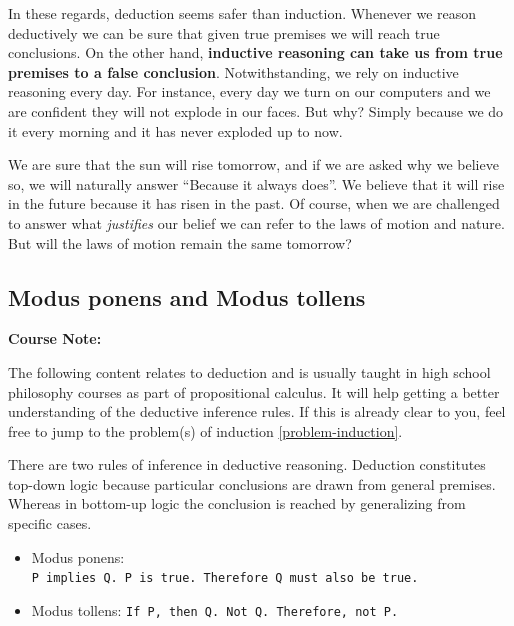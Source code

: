\documentclass[
]{book}
\providecommand{\tightlist}{%
  \setlength{\itemsep}{0pt}\setlength{\parskip}{0pt}}
\begin{document}
In these regards, deduction seems safer than induction. Whenever we reason deductively we can be sure that given true premises we will reach true conclusions. On the other hand, \textbf{inductive reasoning can take us from true premises to a false conclusion}. Notwithstanding, we rely on inductive reasoning every day. For instance, every day we turn on our computers and we are confident they will not explode in our faces. \citep{okasha-pos} But why? Simply because we do it every morning and it has never exploded up to now.

We are sure that the sun will rise tomorrow, and if we are asked why we believe so, we will naturally answer ``Because it always does''. We believe that it will rise in the future because it has risen in the past. Of course, when we are challenged to answer what \emph{justifies} our belief we can refer to the laws of motion and nature. But will the laws of motion remain the same tomorrow? \citep{russell2001problems}

\hypertarget{modus}{%
\subsection{Modus ponens and Modus tollens}\label{modus}}

\begin{notebox}

\begin{center}
\textbf{Course Note:}

\end{center}

The following content relates to deduction and is usually taught in high school philosophy courses as part of propositional calculus. It will help getting a better understanding of the deductive inference rules. If this is already clear to you, feel free to jump to the problem(s) of induction \ref{problem-induction}.

\end{notebox}

There are two rules of inference in deductive reasoning. Deduction constitutes top-down logic because particular conclusions are drawn from general premises. Whereas in bottom-up logic the conclusion is reached by generalizing from specific cases.

\begin{itemize}
\tightlist
\item
  Modus ponens: \texttt{P\ implies\ Q.\ P\ is\ true.\ Therefore\ Q\ must\ also\ be\ true.}
\item
  Modus tollens: \texttt{If\ P,\ then\ Q.\ Not\ Q.\ Therefore,\ not\ P.}
\end{itemize}
\end{document}
